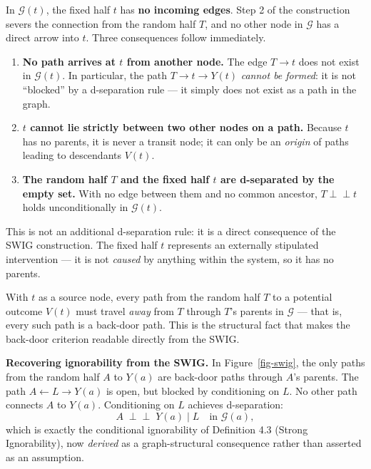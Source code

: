 \documentclass[
  a4paper,
]{book}
\providecommand{\tightlist}{%
  \setlength{\itemsep}{0pt}\setlength{\parskip}{0pt}}
\newcommand{\indep}{\perp\!\!\!\perp}
\newcommand{\Gcal}{\mathcal{G}}
\begin{document}
\begin{tcolorbox}[enhanced jigsaw, arc=.35mm, bottomrule=.15mm, bottomtitle=1mm, breakable, colback=white, colbacktitle=quarto-callout-note-color!10!white, colframe=quarto-callout-note-color-frame, coltitle=black, left=2mm, leftrule=.75mm, opacityback=0, opacitybacktitle=0.6, rightrule=.15mm, title={The Fixed Half Is a Source Node}, titlerule=0mm, toprule=.15mm, toptitle=1mm]

In \(\Gcal(t)\), the fixed half \(t\) has \textbf{no incoming edges}.
Step 2 of the construction severs the connection from the random half
\(T\), and no other node in \(\Gcal\) has a direct arrow into \(t\).
Three consequences follow immediately.

\begin{enumerate}
\def\labelenumi{\arabic{enumi}.}
\tightlist
\item
  \textbf{No path arrives at \(t\) from another node.} The edge
  \(T \to t\) does not exist in \(\Gcal(t)\). In particular, the path
  \(T \to t \to Y(t)\) \emph{cannot be formed}: it is not ``blocked'' by
  a d-separation rule --- it simply does not exist as a path in the
  graph.
\item
  \textbf{\(t\) cannot lie strictly between two other nodes on a path.}
  Because \(t\) has no parents, it is never a transit node; it can only
  be an \emph{origin} of paths leading to descendants \(V(t)\).
\item
  \textbf{The random half \(T\) and the fixed half \(t\) are d-separated
  by the empty set.} With no edge between them and no common ancestor,
  \(T \indep t\) holds unconditionally in \(\Gcal(t)\).
\end{enumerate}

This is not an additional d-separation rule: it is a direct consequence
of the SWIG construction. The fixed half \(t\) represents an externally
stipulated intervention --- it is not \emph{caused} by anything within
the system, so it has no parents.

\end{tcolorbox}

With \(t\) as a source node, every path from the random half \(T\) to a
potential outcome \(V(t)\) must travel \emph{away} from \(T\) through
\(T\)'s parents in \(\Gcal\) --- that is, every such path is a back-door
path. This is the structural fact that makes the back-door criterion
readable directly from the SWIG.

\textbf{Recovering ignorability from the SWIG.} In
Figure~\ref{fig-swig}, the only paths from the random half \(A\) to
\(Y(a)\) are back-door paths through \(A\)'s parents. The path
\(A \leftarrow L \to Y(a)\) is open, but blocked by conditioning on
\(L\). No other path connects \(A\) to \(Y(a)\). Conditioning on \(L\)
achieves d-separation:
\[A \;\indep\; Y(a) \;\big|\; L \quad \text{in } \Gcal(a),\] which is
exactly the conditional ignorability of Definition 4.3 (Strong
Ignorability), now \emph{derived} as a graph-structural consequence
rather than asserted as an assumption.
\end{document}
